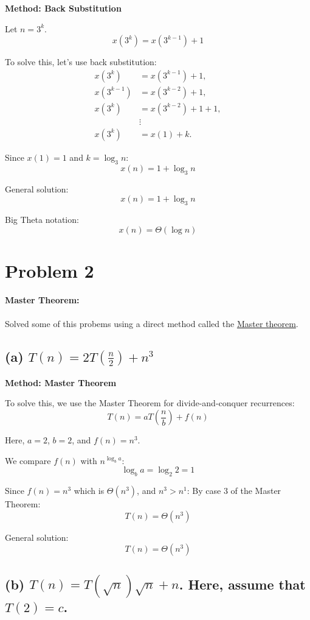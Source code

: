 \documentclass{article}
\begin{document}
\textbf{Method: Back Substitution}

Let \( n = 3^k \).
\[ x(3^k) = x(3^{k-1}) + 1 \]

To solve this, let's use back substitution:
\begin{align*}
x(3^k) &= x(3^{k-1}) + 1, \\
x(3^{k-1}) &= x(3^{k-2}) + 1, \\
x(3^k) &= x(3^{k-2}) + 1 + 1, \\
&\vdots \\
x(3^k) &= x(1) + k.
\end{align*}

Since \( x(1) = 1 \) and \( k = \log_3 n \):
\[ x(n) = 1 + \log_3 n \]

General solution:
\[ x(n) = 1 + \log_3 n \]

Big Theta notation:
\[ x(n) = \Theta(\log n) \]

\section*{Problem 2}

\paragraph*{Master Theorem: }
Solved some of this probems using a direct method called the \href{https://www.programiz.com/dsa/master-theorem}{Master theorem}.

\subsection*{(a) \( T(n) = 2T \left( \frac{n}{2} \right) + n^3 \)}

\textbf{Method: Master Theorem}

To solve this, we use the Master Theorem for divide-and-conquer recurrences:
\[ T(n) = aT \left( \frac{n}{b} \right) + f(n) \]

Here, \( a = 2 \), \( b = 2 \), and \( f(n) = n^3 \).

We compare \( f(n) \) with \( n^{\log_b a} \):
\[ \log_b a = \log_2 2 = 1 \]

Since \( f(n) = n^3 \) which is \( \Theta(n^3) \), and \( n^3 > n^1 \):
By case 3 of the Master Theorem:
\[ T(n) = \Theta(n^3) \]

General solution:
\[ T(n) = \Theta(n^3) \]

\subsection*{(b) \( T(n) = T(\sqrt{n}) \sqrt{n} + n \). Here, assume that \( T(2) = c \).}
\end{document}
